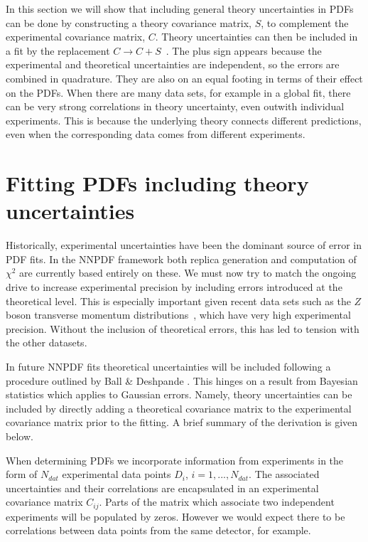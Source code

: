 In this section we will show that including general theory uncertainties in PDFs can be done by constructing a theory covariance matrix, $S$, to complement the experimental covariance matrix, $C$. Theory uncertainties can then be included in a fit by the replacement $C \to C + S$~\cite{Ball:2018odr}. The plus sign appears because the experimental and theoretical uncertainties are independent, so the errors are combined in quadrature. They are also on an equal footing in terms of their effect on the PDFs. When there are many data sets, for example in a global fit, there can be very strong correlations in theory uncertainty, even outwith individual experiments. This is because the underlying theory connects different predictions, even when the corresponding data comes from different experiments. 

\section{Fitting PDFs including theory uncertainties}
Historically, experimental uncertainties have been the dominant source of error in PDF fits. 
In the NNPDF framework both replica generation and computation of $\chi^2$ 
are currently based entirely on these. We must now try to match the ongoing drive to 
increase experimental precision by including errors introduced at the theoretical level. This is
especially important given recent data sets such as the $Z$ boson transverse momentum
distributions~\cite{Aad:2014xaa,Khachatryan:2015oaa,Aad:2015auj}, which have very high experimental precision. Without
the inclusion of theoretical errors, this has led to tension with the other datasets.

In future NNPDF fits theoretical uncertainties will be included following a procedure outlined
by Ball \& Deshpande \cite{Ball:2018odr}. This hinges on a result from Bayesian statistics
which applies to Gaussian errors. Namely, theory uncertainties can be included by directly 
adding a theoretical
covariance matrix to the experimental covariance matrix prior to the fitting. A brief summary of
the derivation is given below.

When determining PDFs we incorporate information from experiments in the form of $N_{dat}$ experimental data points $D_i$, $i=1,...,N_{dat}$. The associated uncertainties and their correlations are encapsulated in an experimental covariance matrix $C_{ij}$. Parts of the matrix which associate two independent experiments will be populated by zeros. However we would expect there to be correlations between data points from the same detector, for example.

